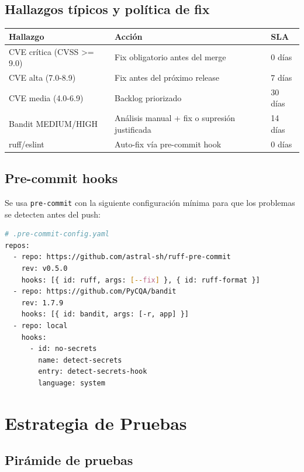 \documentclass[12pt,a4paper,oneside]{article}
\begin{document}
\subsection{Hallazgos típicos y política de fix}

\begin{table}[h]
\centering
\small
\begin{tabularx}{\textwidth}{lXl}
\toprule
\textbf{Hallazgo} & \textbf{Acción} & \textbf{SLA} \\
\midrule
CVE crítica (CVSS >= 9.0) & Fix obligatorio antes del merge & 0 días \\
CVE alta (7.0-8.9) & Fix antes del próximo release & 7 días \\
CVE media (4.0-6.9) & Backlog priorizado & 30 días \\
Bandit MEDIUM/HIGH & Análisis manual + fix o supresión justificada & 14 días \\
ruff/eslint & Auto-fix vía pre-commit hook & 0 días \\
\bottomrule
\end{tabularx}
\end{table}

\subsection{Pre-commit hooks}

Se usa \texttt{pre-commit} con la siguiente configuración mínima para que los problemas se detecten antes del push:

\begin{lstlisting}[language=bash]
# .pre-commit-config.yaml
repos:
  - repo: https://github.com/astral-sh/ruff-pre-commit
    rev: v0.5.0
    hooks: [{ id: ruff, args: [--fix] }, { id: ruff-format }]
  - repo: https://github.com/PyCQA/bandit
    rev: 1.7.9
    hooks: [{ id: bandit, args: [-r, app] }]
  - repo: local
    hooks:
      - id: no-secrets
        name: detect-secrets
        entry: detect-secrets-hook
        language: system
\end{lstlisting}

\section{Estrategia de Pruebas}

\subsection{Pirámide de pruebas}
\end{document}
